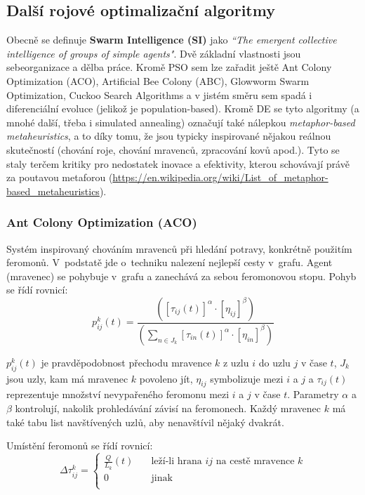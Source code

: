\subsection{Další rojové optimalizační algoritmy}
Obecně se definuje \textbf{Swarm Intelligence (SI)} jako \textit{“The emergent collective intelligence of groups of simple agents"}. Dvě základní vlastnosti jsou sebeorganizace a dělba práce. Kromě PSO sem lze zařadit ještě Ant Colony Optimization (ACO), Artificial Bee Colony (ABC), Glowworm Swarm Optimization, Cuckoo Search Algorithms a v jistém směru sem spadá i diferenciální evoluce (jelikož je population-based). Kromě DE se tyto algoritmy (a mnohé další, třeba i simulated annealing)  označují také nálepkou \textit{metaphor-based metaheuristics}, a to díky tomu, že jsou typicky inspirované nějakou reálnou skutečností (chování roje, chování mravenců, zpracování kovů apod.). Tyto se staly terčem kritiky pro nedostatek inovace a efektivity, kterou schovávají právě za poutavou metaforou (\url{https://en.wikipedia.org/wiki/List_of_metaphor-based_metaheuristics}).

\subsubsection{Ant Colony Optimization (ACO)}
Systém inspirovaný chováním mravenců při hledání potravy, konkrétně použitím feromonů. V~podstatě jde o~techniku nalezení nejlepší cesty v~grafu. Agent (mravenec) se pohybuje v~grafu a zanechává za sebou feromonovou stopu. Pohyb se řídí rovnicí:
$$p^k_{ij}(t) = \frac{([\tau_{ij}(t)]^\alpha \cdot [\eta_{ij}]^\beta)}{(\sum\limits_{n \in J_k}[\tau_{in}(t)]^\alpha \cdot [\eta_{in}]^\beta)}$$

$p^k_{ij}(t)$ je pravděpodobnost přechodu mravence $k$ z uzlu $i$ do uzlu $j$ v čase $t$, $J_k$ jsou uzly, kam má mravenec $k$ povoleno jít, $\eta_{ij}$ symbolizuje  mezi $i$ a $j$ a $\tau_{ij}(t)$ reprezentuje množství nevypařeného feromonu mezi $i$ a $j$ v čase $t$. Parametry $\alpha$ a $\beta$ kontrolují, nakolik prohledávání závisí na feromonech. Každý mravenec $k$ má také tabu list navštívených uzlů, aby nenavštívil nějaký dvakrát.

Umístění feromonů se řídí rovnicí:
\[
\Delta\tau^k_{ij} = 
\begin{cases}
	\frac{Q}{L_k}(t) 	& \quad \text{leží-li hrana $ij$ na cestě mravence $k$} \\
	0 					& \quad \text{jinak}\\
\end{cases}
\]

